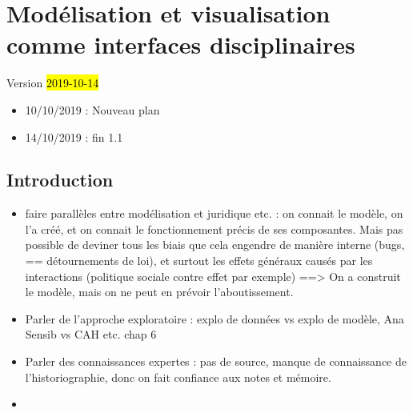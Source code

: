 %

\chapter{Modélisation et visualisation comme interfaces disciplinaires}
\label{chap:chap1}
\begin{center}
	{\large Version \hl{2019-10-14}}
\end{center}

\begin{itemize}
	\item 10/10/2019 : Nouveau plan
	\item 14/10/2019 : fin 1.1
\end{itemize} 

\minitoc

\clearpage
\section*{Introduction}

\begin{itemize}
	\item faire parallèles entre modélisation et juridique etc. : on connait le modèle, on l'a créé, et on connait le fonctionnement précis de ses composantes. Mais pas possible de deviner tous les biais que cela engendre de manière interne (bugs, == détournements de loi), et surtout les effets généraux causés par les interactions (politique sociale contre effet par exemple) ==> On a construit le modèle, mais on ne peut en prévoir l'aboutissement.
	\item Parler de l'approche exploratoire : explo de données vs explo de modèle, Ana Sensib vs CAH etc. chap  6
	\item Parler des connaissances expertes : pas de source, manque de connaissance de l'historiographie, donc on fait confiance aux notes et mémoire.
	\item 
\end{itemize}


